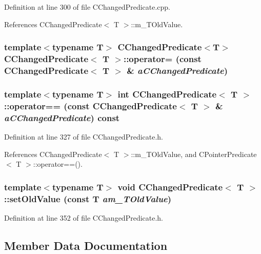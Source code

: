 Definition at line 300 of file CChanged\-Predicate.cpp.

References CChanged\-Predicate$<$ T $>$::m\_\-TOld\-Value.
\subsubsection{\setlength{\rightskip}{0pt plus 5cm}template$<$typename T$>$ CChanged\-Predicate$<$T$>$ CChanged\-Predicate$<$ T $>$::operator= (const CChanged\-Predicate$<$ T $>$ \& {\em a\-CChanged\-Predicate})\hspace{0.3cm}{\tt  [private]}}\label{classCChangedPredicate_c1}


\subsubsection{\setlength{\rightskip}{0pt plus 5cm}template$<$typename T$>$ int CChanged\-Predicate$<$ T $>$::operator== (const CChanged\-Predicate$<$ T $>$ \& {\em a\-CChanged\-Predicate}) const\hspace{0.3cm}{\tt  [inline]}}\label{classCChangedPredicate_a4}




Definition at line 327 of file CChanged\-Predicate.h.

References CChanged\-Predicate$<$ T $>$::m\_\-TOld\-Value, and CPointer\-Predicate$<$ T $>$::operator==().
\subsubsection{\setlength{\rightskip}{0pt plus 5cm}template$<$typename T$>$ void CChanged\-Predicate$<$ T $>$::set\-Old\-Value (const T {\em am\_\-TOld\-Value})\hspace{0.3cm}{\tt  [inline, protected]}}\label{classCChangedPredicate_b0}




Definition at line 352 of file CChanged\-Predicate.h.

\subsection{Member Data Documentation}

